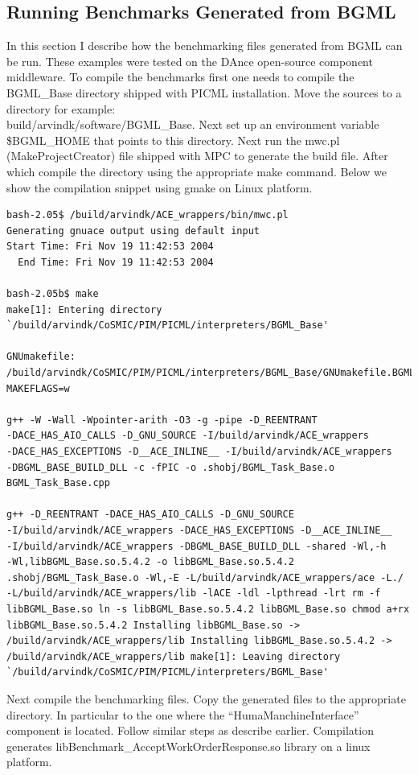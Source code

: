 \documentclass[onecolumn]{article}
\begin{document}
\subsection* {Running Benchmarks Generated from BGML}
In this section I describe how the benchmarking files generated from
BGML can be run. These examples were tested on the DAnce open-source
component middleware. To compile the benchmarks first one needs to
compile the BGML\_Base directory shipped with PICML installation. Move
the sources to a directory for example:
\\build/arvindk/software/BGML\_Base.  Next set up an environment
variable \$BGML\_HOME that points to this directory. Next run the mwc.pl
(MakeProjectCreator) file shipped with MPC to generate the build file.
After which compile the directory using the appropriate make command. Below
we show the compilation snippet using gmake on Linux platform.
{
\footnotesize
\begin{verbatim}
bash-2.05$ /build/arvindk/ACE_wrappers/bin/mwc.pl
Generating gnuace output using default input
Start Time: Fri Nov 19 11:42:53 2004
  End Time: Fri Nov 19 11:42:53 2004

bash-2.05b$ make
make[1]: Entering directory `/build/arvindk/CoSMIC/PIM/PICML/interpreters/BGML_Base'

GNUmakefile:
/build/arvindk/CoSMIC/PIM/PICML/interpreters/BGML_Base/GNUmakefile.BGML_Base
MAKEFLAGS=w

g++ -W -Wall -Wpointer-arith -O3 -g -pipe -D_REENTRANT
-DACE_HAS_AIO_CALLS -D_GNU_SOURCE -I/build/arvindk/ACE_wrappers
-DACE_HAS_EXCEPTIONS -D__ACE_INLINE__ -I/build/arvindk/ACE_wrappers
-DBGML_BASE_BUILD_DLL -c -fPIC -o .shobj/BGML_Task_Base.o
BGML_Task_Base.cpp

g++ -D_REENTRANT -DACE_HAS_AIO_CALLS -D_GNU_SOURCE
-I/build/arvindk/ACE_wrappers -DACE_HAS_EXCEPTIONS -D__ACE_INLINE__
-I/build/arvindk/ACE_wrappers -DBGML_BASE_BUILD_DLL -shared -Wl,-h
-Wl,libBGML_Base.so.5.4.2 -o libBGML_Base.so.5.4.2
.shobj/BGML_Task_Base.o -Wl,-E -L/build/arvindk/ACE_wrappers/ace -L./
-L/build/arvindk/ACE_wrappers/lib -lACE -ldl -lpthread -lrt rm -f
libBGML_Base.so ln -s libBGML_Base.so.5.4.2 libBGML_Base.so chmod a+rx
libBGML_Base.so.5.4.2 Installing libBGML_Base.so ->
/build/arvindk/ACE_wrappers/lib Installing libBGML_Base.so.5.4.2 ->
/build/arvindk/ACE_wrappers/lib make[1]: Leaving directory
`/build/arvindk/CoSMIC/PIM/PICML/interpreters/BGML_Base'
\end{verbatim}
}

Next compile the benchmarking files. Copy the generated files to the
appropriate directory. In particular to the one where the
``HumaManchineInterface'' component is located. Follow similar steps
as describe earlier. Compilation generates
libBenchmark\_AcceptWorkOrderResponse.so library on a linux platform.
\end{document}
